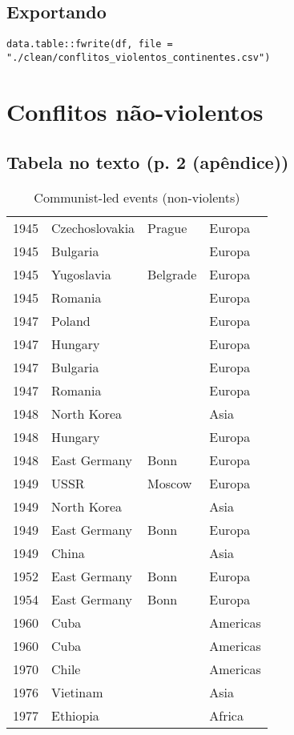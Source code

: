 \documentclass[11pt]{article}
\begin{document}
\subsection*{Exportando}
\label{sec:org6b9d9c9}

\begin{verbatim}
data.table::fwrite(df, file = "./clean/conflitos_violentos_continentes.csv")
\end{verbatim}


\section*{Conflitos não-violentos}
\label{sec:org8e36b4d}

\subsection*{Tabela no texto (p. 2 (apêndice))}
\label{sec:org615eaae}
\begin{table}[htbp]
\caption{\label{nao_violentos}Communist-led events (non-violents)}
\centering
\begin{tabular}{rlll}
\hline
1945 & Czechoslovakia & Prague & Europa\\
1945 & Bulgaria &  & Europa\\
1945 & Yugoslavia & Belgrade & Europa\\
1945 & Romania &  & Europa\\
1947 & Poland &  & Europa\\
1947 & Hungary &  & Europa\\
1947 & Bulgaria &  & Europa\\
1947 & Romania &  & Europa\\
1948 & North Korea &  & Asia\\
1948 & Hungary &  & Europa\\
1948 & East Germany & Bonn & Europa\\
1949 & USSR & Moscow & Europa\\
1949 & North Korea &  & Asia\\
1949 & East Germany & Bonn & Europa\\
1949 & China &  & Asia\\
1952 & East Germany & Bonn & Europa\\
1954 & East Germany & Bonn & Europa\\
1960 & Cuba &  & Americas\\
1960 & Cuba &  & Americas\\
1970 & Chile &  & Americas\\
1976 & Vietinam &  & Asia\\
1977 & Ethiopia &  & Africa\\
\hline
\end{tabular}
\end{table}
\end{document}
